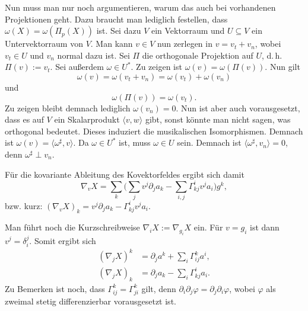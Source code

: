Nun muss man nur noch argumentieren, warum das auch bei vorhandenen
Projektionen geht. Dazu braucht man lediglich festellen, dass
$\omega(X)=\omega(\Pi_p(X))$ ist. Sei dazu $V$ ein Vektorraum
und $U\subseteq V$ ein Untervektorraum von $V$. Man kann $v\in V$
nun zerlegen in $v=v_t+v_n$, wobei $v_t\in U$ und $v_n$ normal
dazu ist. Sei $\Pi$ die orthogonale Projektion auf $U$, d.\,h.
$\Pi(v):=v_t$. Sei außerdem $\omega\in U^*$. Zu zeigen ist
$\omega(v)=\omega(\Pi(v))$. Nun gilt
\begin{equation}
\omega(v) = \omega(v_t+v_n) = \omega(v_t)+\omega(v_n)
\end{equation}
und
\begin{equation}
\omega(\Pi(v)) = \omega(v_t).
\end{equation}
Zu zeigen bleibt demnach lediglich $\omega(v_n)=0$. Nun ist aber
auch vorausgesetzt, dass es auf $V$ ein Skalarprodukt
$\langle v,w\rangle$ gibt, sonst könnte man nicht sagen, was
orthogonal bedeutet. Dieses induziert die musikalischen Isomorphismen.
Demnach ist $\omega(v)=\langle\omega^\sharp,v\rangle$. Da $\omega\in U^*$
ist, muss $\omega\in U$ sein. Demnach ist
$\langle\omega^\sharp,v_n\rangle=0$, denn $\omega^\sharp\perp v_n$.

Für die kovariante Ableitung des Kovektorfeldes ergibt sich damit
\begin{equation}
\nabla_v X = \sum_k \bigg(\sum_j v^j\partial_j a_k
-\sum_{i,j} \Gamma_{kj}^i v^j a_i\bigg)g^k,
\end{equation}
bzw. kurz: $(\nabla_v X)_k = v^j\partial_j a_k-\Gamma_{kj}^i v^j a_i$.

Man führt noch die Kurzschreibweise $\nabla_i X := \nabla_{g_i} X$
ein. Für $v=g_i$ ist dann $v^j = \delta_i^j$. Somit ergibt sich
\begin{align}
(\nabla_j X)^k &= \partial_j a^k + {\textstyle\sum_i}\Gamma_{ij}^k a^i,\\
(\nabla_j X)_k &= \partial_j a_k - {\textstyle\sum_i}\Gamma_{kj}^i a_i.
\end{align}
Zu Bemerken ist noch, dass $\Gamma_{ij}^k = \Gamma_{ji}^k$ gilt,
denn $\partial_i\partial_j\varphi = \partial_j\partial_i\varphi$,
wobei $\varphi$ als zweimal stetig differenzierbar vorausgesetzt ist.

